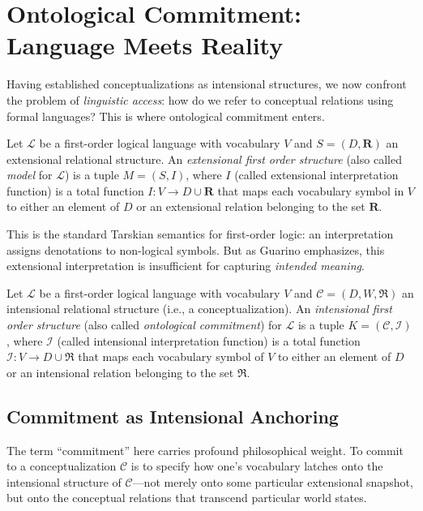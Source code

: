 \section{Ontological Commitment: Language Meets Reality}

Having established conceptualizations as intensional structures, we now confront the problem of \emph{linguistic access}: how do we refer to conceptual relations using formal languages? This is where ontological commitment enters.

\begin{definition}
	Let $\mathcal{L}$ be a first-order logical language with vocabulary $V$ and $S = (D, \mathbf{R})$ an extensional relational structure. An \emph{extensional first order structure} (also called \emph{model} for $\mathcal{L}$) is a tuple $M = (S, I)$, where $I$ (called extensional interpretation function) is a total function $I : V \to D \cup \mathbf{R}$ that maps each vocabulary symbol in $V$ to either an element of $D$ or an extensional relation belonging to the set $\mathbf{R}$.
\end{definition}

This is the standard Tarskian semantics for first-order logic: an interpretation assigns denotations to non-logical symbols. But as Guarino emphasizes, this extensional interpretation is insufficient for capturing \emph{intended meaning}.

\begin{definition}
	Let $\mathcal{L}$ be a first-order logical language with vocabulary $V$ and $\mathcal{C} = (D, W, \mathfrak{R})$ an intensional relational structure (i.e., a conceptualization). An \emph{intensional first order structure} (also called \emph{ontological commitment}) for $\mathcal{L}$ is a tuple $K = (\mathcal{C}, \mathcal{I})$, where $\mathcal{I}$ (called intensional interpretation function) is a total function $\mathcal{I} : V \to D \cup \mathfrak{R}$ that maps each vocabulary symbol of $V$ to either an element of $D$ or an intensional relation belonging to the set $\mathfrak{R}$.
\end{definition}

\subsection{Commitment as Intensional Anchoring}

The term ``commitment'' here carries profound philosophical weight. To commit to a conceptualization $\mathcal{C}$ is to specify how one's vocabulary latches onto the intensional structure of $\mathcal{C}$—not merely onto some particular extensional snapshot, but onto the conceptual relations that transcend particular world states.


